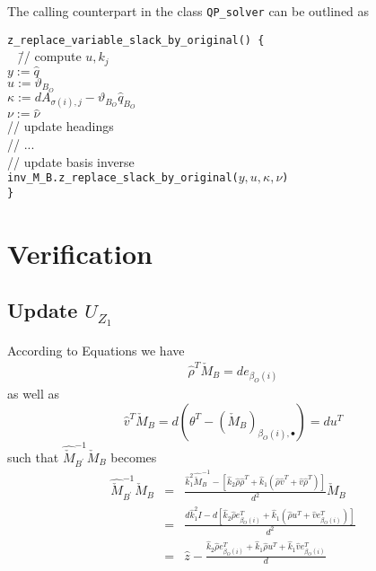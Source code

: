 \documentclass[a4paper]{article}
\begin{document}
The calling counterpart in the class \texttt{QP\_solver} can be outlined as
\begin{tabbing}
\texttt{z\_replace\_variable\_slack\_by\_original() \{} \\
\texttt{  } \= // compute $u, k_{j}$ \\
\> \texttt{$y:=\hat{q}$} \\
\> \texttt{$u:=\vartheta_{B_{O}}$} \\
\> \texttt{$\kappa:=dA_{\sigma(i), j}-\vartheta_{B_{O}}\hat{q}_{B_{O}}$} \\
\> \texttt{$\nu:=\hat{\nu}$} \\
\> // update headings \\
\> // ... \\
\> // update basis inverse \\
\> \texttt{inv\_M\_B.z\_replace\_slack\_by\_original($y, u, \kappa, \nu$)}
\\
\texttt{\}}
\end{tabbing}



\section{Verification}
\subsection{Update $U_{Z_{1}}$}
According to Equations  we have
\begin{eqnarray}
\hat{\rho}^{T}\check{M}_{B}=de_{\beta_{O}(i)}
\end{eqnarray}
as well as 
\begin{equation}
\hat{v}^{T}\check{M}_{B}=
d\left(\theta^{T} 
   -\left(\check{M}_{B}\right)_{\beta_{O}(i), \bullet}
 \right)
=
du^{T}
\end{equation}
such that $\hat{\check{M}}_{B^{\prime}}^{-1}\check{M}_{B}$ becomes
\begin{eqnarray}
\hat{\check{M}}_{B^{\prime}}^{-1}
\check{M}_{B}
&=&
\frac{
\hat{k}_{1}^{2}\hat{\check{M}}_{B}^{-1}
-\left[
  \hat{k}_{2}\hat{\rho}\hat{\rho}^{T}
  +\hat{k}_{1}\left(\hat{\rho}\hat{v}^{T} +\hat{v}\hat{\rho}^{T}\right)
 \right]
}{d^{2}}
\check{M}_{B}
\nonumber \\
&=&
\frac{
  d\hat{k}_{1}^{2}I
  -d
  \left[
    \hat{k}_{2}\hat{\rho}e_{\beta_{O}(i)}^{T}
    +\hat{k}_{1}
    \left(
      \hat{\rho}u^{T}
      +\hat{v}e_{\beta_{O}(i)}^{T}
    \right)
  \right]
}{d^{2}}
\nonumber \\
&=&
\hat{z}
-\frac{
  \hat{k}_{2}\hat{\rho}e_{\beta_{O}(i)}^{T}
  +\hat{k}_{1}\hat{\rho}u^{T}
  +\hat{k}_{1}\hat{v}e_{\beta_{O}(i)}^{T}
}{d}
\end{eqnarray}
\end{document}
